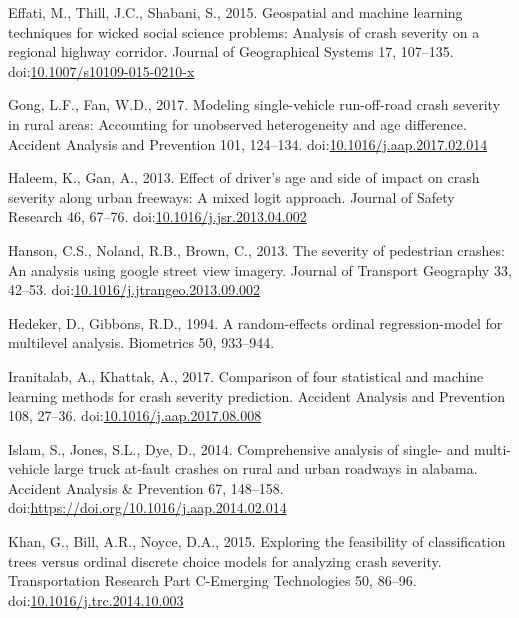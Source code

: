 \documentclass[]{elsarticle} %
\begin{document}
\leavevmode\hypertarget{ref-Effati2015geospatial}{}%
Effati, M., Thill, J.C., Shabani, S., 2015. Geospatial and machine
learning techniques for wicked social science problems: Analysis of
crash severity on a regional highway corridor. Journal of Geographical
Systems 17, 107--135.
doi:\href{https://doi.org/10.1007/s10109-015-0210-x}{10.1007/s10109-015-0210-x}

\leavevmode\hypertarget{ref-Gong2017modeling}{}%
Gong, L.F., Fan, W.D., 2017. Modeling single-vehicle run-off-road crash
severity in rural areas: Accounting for unobserved heterogeneity and age
difference. Accident Analysis and Prevention 101, 124--134.
doi:\href{https://doi.org/10.1016/j.aap.2017.02.014}{10.1016/j.aap.2017.02.014}

\leavevmode\hypertarget{ref-Haleem2013effect}{}%
Haleem, K., Gan, A., 2013. Effect of driver's age and side of impact on
crash severity along urban freeways: A mixed logit approach. Journal of
Safety Research 46, 67--76.
doi:\href{https://doi.org/10.1016/j.jsr.2013.04.002}{10.1016/j.jsr.2013.04.002}

\leavevmode\hypertarget{ref-Hanson2013severity}{}%
Hanson, C.S., Noland, R.B., Brown, C., 2013. The severity of pedestrian
crashes: An analysis using google street view imagery. Journal of
Transport Geography 33, 42--53.
doi:\href{https://doi.org/10.1016/j.jtrangeo.2013.09.002}{10.1016/j.jtrangeo.2013.09.002}

\leavevmode\hypertarget{ref-Hedeker1994random}{}%
Hedeker, D., Gibbons, R.D., 1994. A random-effects ordinal
regression-model for multilevel analysis. Biometrics 50, 933--944.

\leavevmode\hypertarget{ref-Iranitalab2017comparison}{}%
Iranitalab, A., Khattak, A., 2017. Comparison of four statistical and
machine learning methods for crash severity prediction. Accident
Analysis and Prevention 108, 27--36.
doi:\href{https://doi.org/10.1016/j.aap.2017.08.008}{10.1016/j.aap.2017.08.008}

\leavevmode\hypertarget{ref-Islam2014comprehensive}{}%
Islam, S., Jones, S.L., Dye, D., 2014. Comprehensive analysis of single-
and multi-vehicle large truck at-fault crashes on rural and urban
roadways in alabama. Accident Analysis \& Prevention 67, 148--158.
doi:\href{https://doi.org/https://doi.org/10.1016/j.aap.2014.02.014}{https://doi.org/10.1016/j.aap.2014.02.014}

\leavevmode\hypertarget{ref-Khan2015exploring}{}%
Khan, G., Bill, A.R., Noyce, D.A., 2015. Exploring the feasibility of
classification trees versus ordinal discrete choice models for analyzing
crash severity. Transportation Research Part C-Emerging Technologies 50,
86--96.
doi:\href{https://doi.org/10.1016/j.trc.2014.10.003}{10.1016/j.trc.2014.10.003}
\end{document}
